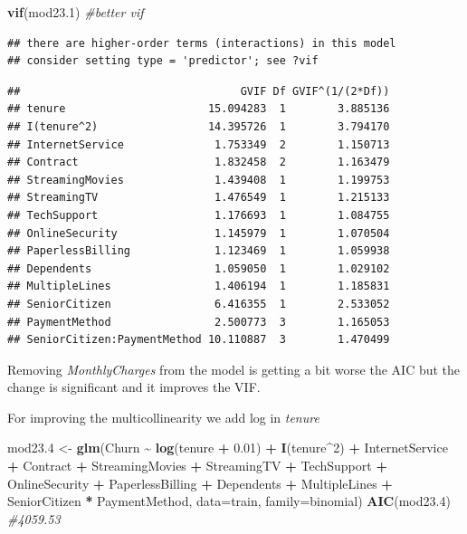 \documentclass[
  twoside]{article}
\newenvironment{Shaded}{\begin{snugshade}}{\end{snugshade}}
\newcommand{\AttributeTok}[1]{\textcolor[rgb]{0.13,0.29,0.53}{#1}}
\newcommand{\CommentTok}[1]{\textcolor[rgb]{0.56,0.35,0.01}{\textit{#1}}}
\newcommand{\DecValTok}[1]{\textcolor[rgb]{0.00,0.00,0.81}{#1}}
\newcommand{\FloatTok}[1]{\textcolor[rgb]{0.00,0.00,0.81}{#1}}
\newcommand{\FunctionTok}[1]{\textcolor[rgb]{0.13,0.29,0.53}{\textbf{#1}}}
\newcommand{\NormalTok}[1]{#1}
\newcommand{\OtherTok}[1]{\textcolor[rgb]{0.56,0.35,0.01}{#1}}
\newcommand{\SpecialCharTok}[1]{\textcolor[rgb]{0.81,0.36,0.00}{\textbf{#1}}}
\begin{document}
\begin{Shaded}
\begin{Highlighting}[]
\FunctionTok{vif}\NormalTok{(mod23}\FloatTok{.1}\NormalTok{) }\CommentTok{\#better vif}
\end{Highlighting}
\end{Shaded}

\begin{verbatim}
## there are higher-order terms (interactions) in this model
## consider setting type = 'predictor'; see ?vif
\end{verbatim}

\begin{verbatim}
##                                  GVIF Df GVIF^(1/(2*Df))
## tenure                      15.094283  1        3.885136
## I(tenure^2)                 14.395726  1        3.794170
## InternetService              1.753349  2        1.150713
## Contract                     1.832458  2        1.163479
## StreamingMovies              1.439408  1        1.199753
## StreamingTV                  1.476549  1        1.215133
## TechSupport                  1.176693  1        1.084755
## OnlineSecurity               1.145979  1        1.070504
## PaperlessBilling             1.123469  1        1.059938
## Dependents                   1.059050  1        1.029102
## MultipleLines                1.406194  1        1.185831
## SeniorCitizen                6.416355  1        2.533052
## PaymentMethod                2.500773  3        1.165053
## SeniorCitizen:PaymentMethod 10.110887  3        1.470499
\end{verbatim}

Removing \emph{MonthlyCharges} from the model is getting a bit worse the
AIC but the change is significant and it improves the VIF.

For improving the multicollinearity we add log in \emph{tenure}

\begin{Shaded}
\begin{Highlighting}[]
\NormalTok{mod23}\FloatTok{.4} \OtherTok{\textless{}{-}} \FunctionTok{glm}\NormalTok{(Churn }\SpecialCharTok{\textasciitilde{}} \FunctionTok{log}\NormalTok{(tenure }\SpecialCharTok{+} \FloatTok{0.01}\NormalTok{) }\SpecialCharTok{+} \FunctionTok{I}\NormalTok{(tenure}\SpecialCharTok{\^{}}\DecValTok{2}\NormalTok{) }\SpecialCharTok{+}\NormalTok{ InternetService }\SpecialCharTok{+} 
\NormalTok{                 Contract }\SpecialCharTok{+}\NormalTok{ StreamingMovies }\SpecialCharTok{+}\NormalTok{ StreamingTV }\SpecialCharTok{+}\NormalTok{ TechSupport }\SpecialCharTok{+} 
\NormalTok{                 OnlineSecurity }\SpecialCharTok{+}\NormalTok{ PaperlessBilling }\SpecialCharTok{+}\NormalTok{ Dependents }\SpecialCharTok{+}\NormalTok{ MultipleLines}
               \SpecialCharTok{+}\NormalTok{ SeniorCitizen }\SpecialCharTok{*}\NormalTok{ PaymentMethod, }\AttributeTok{data=}\NormalTok{train, }\AttributeTok{family=}\NormalTok{binomial)}
\FunctionTok{AIC}\NormalTok{(mod23}\FloatTok{.4}\NormalTok{) }\CommentTok{\#4059.53}
\end{Highlighting}
\end{Shaded}
\end{document}
